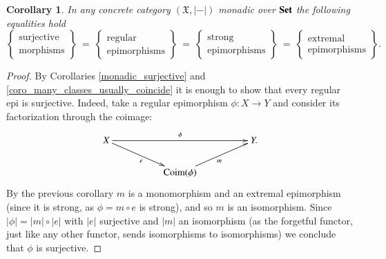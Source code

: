 \documentclass[12pt]{article}
\newtheorem{corollary}[lemma]{Corollary}
\theoremstyle{definition}
\def\X{\mathfrak X}
\def\Coim{\mathrm{Coim}}
\newcommand{\Set}{\textbf{\textup{Set}}}
\numberwithin{equation}{section}
\begin{document}
\begin{corollary}
	In any concrete category $(\X, |-|)$ monadic over $\Set$ the following equalities hold\[
	\left\{ \begin{matrix}\text{surjective}\\\text{morphisms}\end{matrix}\right\}\ \overset{}=\ \left\{ \begin{matrix}\text{regular}\\\text{epimorphisms}\end{matrix}\right\}\ \overset{}=\ \left\{ \begin{matrix}\text{strong}\\\text{epimorphisms}\end{matrix}\right\}\ \overset{}=\ \left\{ \begin{matrix}\text{extremal}\\\text{epimorphisms}\end{matrix}\right\}.
	\]
\end{corollary}
\begin{proof}By Corollaries \ref{monadic_surjective} and \ref{coro_many_classes_usually_coincide} it is enough to show that every regular epi is surjective. Indeed, take a regular epimorphism $\phi\colon X\to Y$ and consider its factorization through the coimage:
	\[
	\xymatrix@R=20pt@C=50pt{
		X\ar[rr]^{\phi}\ar[dr]_e&&Y.\\
		&\Coim(\phi)\ar[ur]_m
	}
	\] 
	By the previous corollary $m$ is a monomorphism and an extremal epimorphism (since it is strong, as $\phi=m\circ e$ is strong), and so $m$ is an isomorphism. Since $|\phi|=|m|\circ |e|$ with $|e|$ surjective and $|m|$ an isomorphism (as the forgetful functor, just like any other functor, sends isomorphisms to isomorphisms) we conclude that $\phi$ is surjective.
\end{proof}
\end{document}

